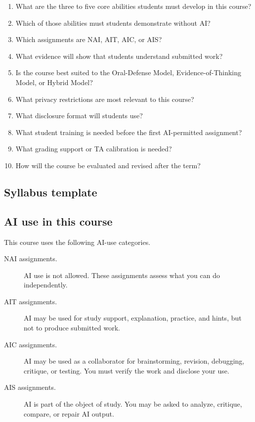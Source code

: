 \documentclass{SIAMbook2023}
\begin{document}
\begin{enumerate}
  \item What are the three to five core abilities students must develop in this course?
  \item Which of those abilities must students demonstrate without AI?
  \item Which assignments are NAI, AIT, AIC, or AIS?
  \item What evidence will show that students understand submitted work?
  \item Is the course best suited to the Oral-Defense Model, Evidence-of-Thinking Model, or Hybrid Model?
  \item What privacy restrictions are most relevant to this course?
  \item What disclosure format will students use?
  \item What student training is needed before the first AI-permitted assignment?
  \item What grading support or TA calibration is needed?
  \item How will the course be evaluated and revised after the term?
\end{enumerate}

\subsection{Syllabus template}
\label{u:app:syllabus-template}

\subsection*{AI use in this course}

This course uses the following AI-use categories.

\begin{description}
  \item[NAI assignments.] AI use is not allowed. These assignments assess what you can do independently.
  \item[AIT assignments.] AI may be used for study support, explanation, practice, and hints, but not to produce submitted work.
  \item[AIC assignments.] AI may be used as a collaborator for brainstorming, revision, debugging, critique, or testing. You must verify the work and disclose your use.
  \item[AIS assignments.] AI is part of the object of study. You may be asked to analyze, critique, compare, or repair AI output.
\end{description}
\end{document}
